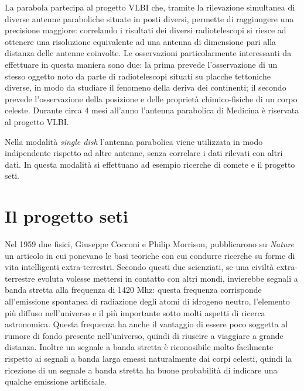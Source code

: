 La parabola partecipa al progetto \ac{VLBI} che, tramite la rilevazione
simultanea di diverse antenne paraboliche situate in posti diversi, permette di
raggiungere una precisione maggiore: correlando i risultati dei diversi
radiotelescopi si riesce ad ottenere una risoluzione equivalente ad una antenna
di dimensione pari alla distanza delle antenne coinvolte. Le osservazioni
particolarmente interessanti da effettuare in questa maniera sono due: la prima
prevede l'osservazione di un stesso oggetto noto da parte di radiotelescopi
situati su placche tettoniche diverse, in modo da studiare il fenomeno della
deriva dei continenti; il secondo prevede l'osservazione della posizione e delle
propriet\`a chimico-fisiche di un corpo celeste. Durante circa 4 mesi all'anno
l'antenna parabolica di Medicina \`e riservata al progetto \ac{VLBI}.

Nella modalit\`a \emph{single dish} l'antenna parabolica viene utilizzata in
modo indipendente rispetto ad altre antenne, senza correlare i dati rilevati con
altri dati. In questa modalit\`a si effettuano ad esempio ricerche di comete e
il progetto \ac{seti}.

\section*{Il progetto \ac{seti}}
Nel 1959 due fisici, Giuseppe Cocconi e Philip Morrison, pubblicarono su
\emph{Nature} un articolo in cui ponevano le basi teoriche con cui condurre
ricerche su forme di vita intelligenti extra-terrestri. Secondo questi due
scienziati, se una civilt\`a extra-terrestre evoluta volesse mettersi in
contatto con altri mondi, invierebbe segnali a banda stretta alla frequenza di
1420 Mhz: questa frequenza corrisponde all'emissione spontanea di radiazione
degli atomi di idrogeno neutro, l'elemento pi\`u diffuso nell'universo e il
pi\`u importante sotto molti aspetti di ricerca astronomica. Questa frequenza ha
anche il vantaggio di essere poco soggetta al rumore di fondo presente
nell'universo, quindi di riuscire a viaggiare a grande distanza. Inoltre un
segnale a banda stretta \`e riconosibile molto facilmente rispetto ai segnali a
banda larga emessi naturalmente dai corpi celesti, quindi la ricezione di un
segnale a banda stretta ha buone probabilit\`a di indicare una qualche emissione
artificiale.

